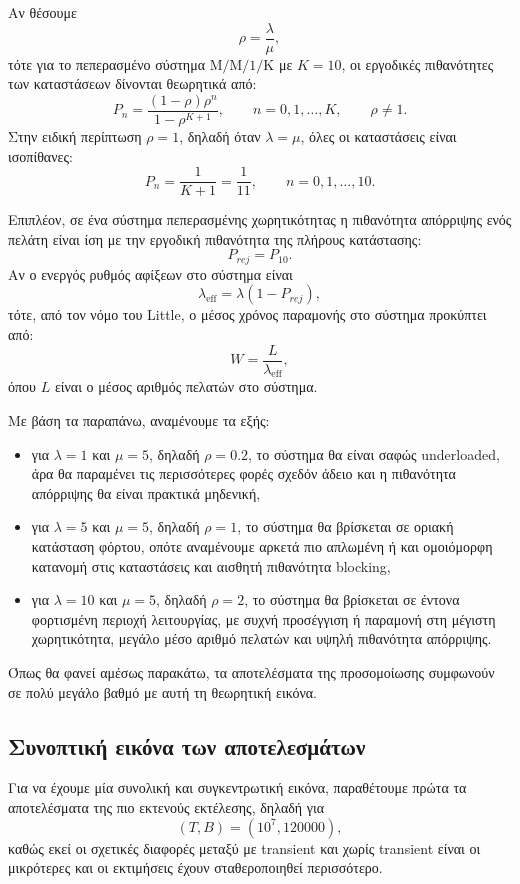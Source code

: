 \documentclass{article}
\begin{document}
Αν θέσουμε
\[
\rho=\frac{\lambda}{\mu},
\]
τότε για το πεπερασμένο σύστημα $\mathrm{M/M/1/K}$ με $K=10$, οι εργοδικές πιθανότητες των καταστάσεων δίνονται θεωρητικά από:
\[
P_n=\frac{(1-\rho)\rho^n}{1-\rho^{K+1}}, \qquad n=0,1,\ldots,K,\qquad \rho\neq 1.
\]
Στην ειδική περίπτωση $\rho=1$, δηλαδή όταν $\lambda=\mu$, όλες οι καταστάσεις είναι ισοπίθανες:
\[
P_n=\frac{1}{K+1}=\frac{1}{11}, \qquad n=0,1,\ldots,10.
\]

Επιπλέον, σε ένα σύστημα πεπερασμένης χωρητικότητας η πιθανότητα απόρριψης ενός πελάτη είναι ίση με την εργοδική πιθανότητα της πλήρους κατάστασης:
\[
P_{rej}=P_{10}.
\]
Αν ο ενεργός ρυθμός αφίξεων στο σύστημα είναι
\[
\lambda_{\text{eff}}=\lambda(1-P_{rej}),
\]
τότε, από τον νόμο του Little, ο μέσος χρόνος παραμονής στο σύστημα προκύπτει από:
\[
W=\frac{L}{\lambda_{\text{eff}}},
\]
όπου $L$ είναι ο μέσος αριθμός πελατών στο σύστημα.

Με βάση τα παραπάνω, αναμένουμε τα εξής:

\begin{itemize}
    \item για $\lambda=1$ και $\mu=5$, δηλαδή $\rho=0.2$, το σύστημα θα είναι σαφώς \foreignlanguage{english}{underloaded}, άρα θα παραμένει τις περισσότερες φορές σχεδόν άδειο και η πιθανότητα απόρριψης θα είναι πρακτικά μηδενική,
    \item για $\lambda=5$ και $\mu=5$, δηλαδή $\rho=1$, το σύστημα θα βρίσκεται σε οριακή κατάσταση φόρτου, οπότε αναμένουμε αρκετά πιο απλωμένη ή και ομοιόμορφη κατανομή στις καταστάσεις και αισθητή πιθανότητα blocking,
    \item για $\lambda=10$ και $\mu=5$, δηλαδή $\rho=2$, το σύστημα θα βρίσκεται σε έντονα φορτισμένη περιοχή λειτουργίας, με συχνή προσέγγιση ή παραμονή στη μέγιστη χωρητικότητα, μεγάλο μέσο αριθμό πελατών και υψηλή πιθανότητα απόρριψης.
\end{itemize}

Όπως θα φανεί αμέσως παρακάτω, τα αποτελέσματα της προσομοίωσης συμφωνούν σε πολύ μεγάλο βαθμό με αυτή τη θεωρητική εικόνα.

\subsection{Συνοπτική εικόνα των αποτελεσμάτων}

Για να έχουμε μία συνολική και συγκεντρωτική εικόνα, παραθέτουμε πρώτα τα αποτελέσματα της πιο εκτενούς εκτέλεσης, δηλαδή για
\[
(T,B)=(10^7,120000),
\]
καθώς εκεί οι σχετικές διαφορές μεταξύ με transient και χωρίς transient είναι οι μικρότερες και οι εκτιμήσεις έχουν σταθεροποιηθεί περισσότερο.
\end{document}
